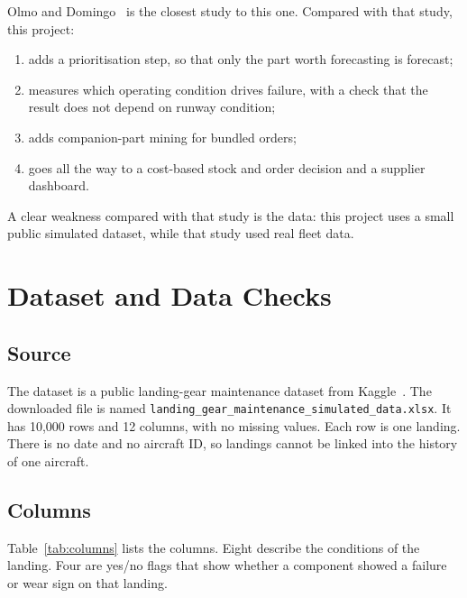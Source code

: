 \documentclass[12pt,oneside]{report}
\begin{document}
Olmo and Domingo~\cite{olmo2026} is the closest study to this one. Compared with that study, this project:
\begin{enumerate}
\item adds a prioritisation step, so that only the part worth forecasting is forecast;
\item measures which operating condition drives failure, with a check that the result does not depend on runway condition;
\item adds companion-part mining for bundled orders;
\item goes all the way to a cost-based stock and order decision and a supplier dashboard.
\end{enumerate}
A clear weakness compared with that study is the data: this project uses a small public simulated dataset, while that study used real fleet data.

\chapter{Dataset and Data Checks}
\label{ch:data}

\section{Source}
The dataset is a public landing-gear maintenance dataset from Kaggle~\cite{kaggle}. The downloaded file is named \texttt{landing\_gear\_maintenance\_simulated\_data.xlsx}. It has 10,000 rows and 12 columns, with no missing values. Each row is one landing. There is no date and no aircraft ID, so landings cannot be linked into the history of one aircraft.

\section{Columns}
Table~\ref{tab:columns} lists the columns. Eight describe the conditions of the landing. Four are yes/no flags that show whether a component showed a failure or wear sign on that landing.
\end{document}

